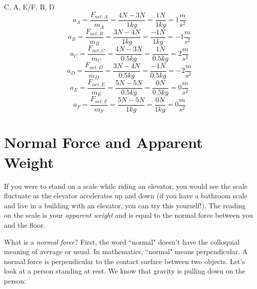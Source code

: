 \begin{Answer}[ref = netF]
C, A, E/F, B, D
$$a_A = \frac{F_{net, A}}{m_A} = \frac{4N - 3N}{1kg} = \frac{1N}{1kg} = 1 
\frac{m}{s^2}$$
$$a_B = \frac{F_{net, B}}{m_B} = \frac{3N - 4N}{1kg} = \frac{-1N}{1kg} = -1 
\frac{m}{s^2}$$
$$a_C = \frac{F_{net, C}}{m_C} = \frac{4N - 3N}{0.5kg} = \frac{1N}{0.5kg} = 2 
\frac{m}{s^2}$$
$$a_D = \frac{F_{net, D}}{m_D} = \frac{3N - 4N}{0.5kg} = \frac{-1N}{0.5kg} = -2 
\frac{m}{s^2}$$
$$a_E = \frac{F_{net, E}}{m_E} = \frac{5N - 5N}{0.5kg} = \frac{0N}{0.5kg} = 0 
\frac{m}{s^2}$$
$$a_F = \frac{F_{net, F}}{m_F} = \frac{5N - 5N}{1kg} = \frac{0N}{1kg} = 0 
\frac{m}{s^2}$$
\end{Answer}

\section{Normal Force and Apparent Weight}
If you were to stand on a scale while riding an elevator, you would see the scale 
fluctuate as the elevator accelerates up and down (if you have a bathroom scale 
and live in a building with an elevator, you can try this yourself!). The reading 
on the scale is your \textit{apparent weight} and is equal to the normal force 
between you and the floor. 

What is a \textit{normal force}? First, the word ``normal" doesn't have the 
colloquial meaning of average or usual. In mathematics, ``normal" means 
perpendicular. A normal force is perpendicular to the contact surface between 
two objects. Let's look at a person standing at rest. We know that gravity is 
pulling down on the person:

